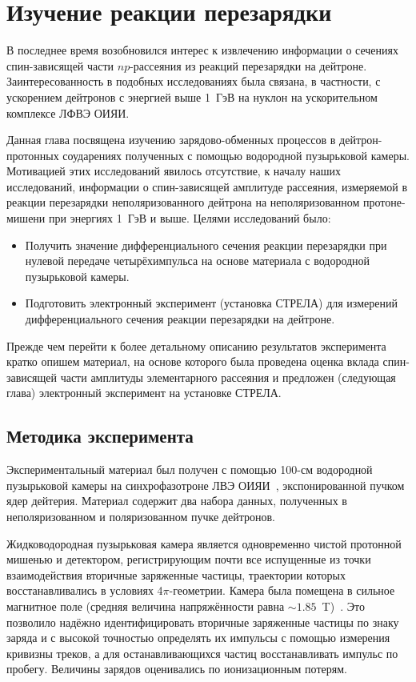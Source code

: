 \chapter{Изучение реакции перезарядки
  \maybebm{{\dpchex}}}
В последнее время возобновился интерес к извлечению  информации о сечениях
спин-зависящей части $np$-рассеяния из реакций перезарядки на дейтроне.
Заинтересованность в подобных исследованиях была связана, в частности, с
ускорением дейтронов с энергией выше 1~ГэВ на нуклон на ускорительном комплексе
ЛФВЭ ОИЯИ.

Данная глава посвящена изучению зарядово-обменных процессов в дейтрон-протонных
соударениях полученных с помощью водородной пузырьковой камеры. Мотивацией этих
исследований явилось отсутствие, к началу наших исследований, информации о
спин-зависящей амплитуде \np рассеяния, измеряемой в реакции перезарядки
неполяризованного дейтрона на неполяризованном протоне-мишени при энергиях 1~ГэВ
и выше. Целями исследований было:

\begin{itemize}
\item Получить значение дифференциального сечения реакции перезарядки \dpchex
  при нулевой передаче четырёхимпульса на основе материала с водородной
  пузырьковой камеры.
\item Подготовить электронный эксперимент (установка СТРЕЛА) для измерений
  дифференциального сечения реакции перезарядки на дейтроне.
\end{itemize}

Прежде чем перейти к более детальному описанию результатов эксперимента кратко
опишем материал, на основе которого была проведена оценка вклада спин-зависящей
части амплитуды элементарного \np рассеяния и предложен (следующая глава)
электронный эксперимент на установке СТРЕЛА.

\section{Методика эксперимента}
Экспериментальный материал был получен с помощью 100-см водородной пузырьковой
камеры на синхрофазотроне ЛВЭ ОИЯИ~\cite{belon65}, экспонированной пучком ядер
дейтерия. Материал содержит два набора данных, полученных в неполяризованном и
поляризованном пучке дейтронов.

Жидководородная пузырьковая камера является одновременно чистой протонной
мишенью и детектором, регистрирующим почти все испущенные из точки
взаимодействия вторичные заряженные частицы, траектории которых
восстанавливались в условиях 4$\pi$-геометрии. Камера была помещена в сильное
магнитное поле (средняя величина напряжённости равна
$\sim 1.85$~T)~\cite{glagolev94}. Это позволило надёжно идентифицировать
вторичные заряженные частицы по знаку заряда и с высокой точностью определять их
импульсы с помощью измерения кривизны треков, а для останавливающихся частиц
восстанавливать импульс по пробегу. Величины зарядов оценивались по
ионизационным потерям.

